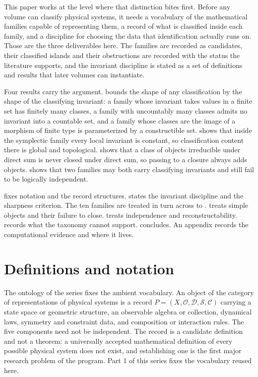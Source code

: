 \documentclass[11pt,letterpaper]{article}
\theoremstyle{definition}
\theoremstyle{remark}
\begin{document}
This paper works at the level where that distinction bites first. Before any volume can classify physical systems, it needs a vocabulary of the mathematical families capable of representing them, a record of what is classified inside each family, and a discipline for choosing the data that identification actually runs on. Those are the three deliverables here. The families are recorded as candidates, their classified islands and their obstructions are recorded with the status the literature supports, and the invariant discipline is stated as a set of definitions and results that later volumes can instantiate.

Four results carry the argument.  bounds the shape of any classification by the shape of the classifying invariant: a family whose invariant takes values in a finite set has finitely many classes, a family with uncountably many classes admits no invariant into a countable set, and a family whose classes are the image of a morphism of finite type is parameterized by a constructible set.  shows that inside the symplectic family every local invariant is constant, so classification content there is global and topological.  shows that a class of objects irreducible under direct sum is never closed under direct sum, so passing to a closure always adds objects.  shows that two families may both carry classifying invariants and still fail to be logically independent.

 fixes notation and the record structures.  states the invariant discipline and the sharpness criterion. The ten families are treated in turn across  to .  treats simple objects and their failure to close.  treats independence and reconstructability.  records what the taxonomy cannot support.  concludes. An appendix records the computational evidence and where it lives.

\section{Definitions and notation}
\label{sec:defs}

The ontology of the series fixes the ambient vocabulary. An object of the category of representations of physical systems is a record $P = (X, \mathcal{O}, \mathcal{D}, \mathcal{S}, \mathcal{C})$ carrying a state space or geometric structure, an observable algebra or collection, dynamical laws, symmetry and constraint data, and composition or interaction rules. The five components need not be independent. The record is a candidate definition and not a theorem: a universally accepted mathematical definition of every possible physical system does not exist, and establishing one is the first major research problem of the program. Part 1 of this series fixes the vocabulary reused here.
\end{document}
